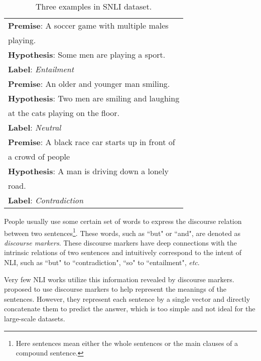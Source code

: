 \documentclass[11pt,letterpaper]{article}
\begin{document}
\begin{table}
	\begin{center}
		\begin{tabular}{l}
			\toprule
			\textbf{Premise}: A soccer game with multiple males\\ playing.\\
			{\textbf{Hypothesis}: Some men are playing a sport.}\\ 
			\textbf{Label}: \emph{Entailment}\\ \hline
			{\textbf{Premise}: An older and younger man smiling.}\\
			\textbf{Hypothesis}: Two men are smiling and laughing\\ at the cats playing on the floor.\\
			\textbf{Label}: \emph{Neutral}\\ \hline
            \textbf{Premise}: A black race car starts up in front of\\ a crowd of people\\
			\textbf{Hypothesis}: A man is driving down a lonely\\ road.\\
			\textbf{Label}: \emph{Contradiction}\\
			\bottomrule
		\end{tabular}
	\end{center}
	\caption{\label{tab1} Three examples in SNLI dataset.}       
\end{table}


People usually use some certain set of words to express the discourse relation between two sentences\footnote{Here sentences mean either the whole sentences or the main clauses of a compound sentence.}. These words, such as ``but" or ``and", are denoted as \emph{discourse markers}. These discourse markers have deep connections with the intrinsic relations of two sentences and intuitively correspond to the intent of NLI, such as ``but" to ``contradiction", ``so" to ``entailment", \emph{etc}. 

Very few NLI works utilize this information revealed by discourse markers. \citet{nie2017dissent} proposed to use discourse markers to help represent the meanings of the sentences. However, they represent each sentence by a single vector and directly concatenate them to predict the answer, which is too simple and not ideal for the large-scale datasets.
\end{document}
